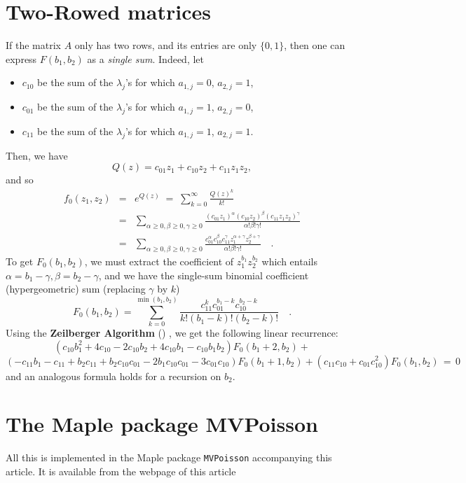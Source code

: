 \documentclass[11pt]{article}
\newcommand{\beqn}{\begin{eqnarray*}}
\newcommand{\eeqn}{\end{eqnarray*}}
\begin{document}
\section{Two-Rowed matrices}
\label{sec:tworow}

If the matrix $A$ only has two rows, and its entries are only $\{0,1\}$, then
one can express $F(b_1,b_2)$ as a \emph{single sum}. Indeed, let


\begin{itemize}
\item
$c_{10}$ be the sum of the $\lambda _j$'s for which $a_{1,j}=0$, $a_{2,j}=1$,
\item
$c_{01}$ be the sum of the $\lambda _j$'s  for which $a_{1,j}=1$, $a_{2,j}=0$,
\item
$c_{11}$ be the sum of the $\lambda _j$'s for which $a_{1,j}=1$, $a_{2,j}=1$.
\end{itemize}
Then, we have
\[
Q(z)=c_{01} z_1+c_{10}z_2+c_{11}z_1z_2 ,
\]
and so
\beqn
f_0(z_1,z_2) &=& e^{Q(z)} \;=\; \sum_{k=0}^{\infty} \frac{Q(z)^k}{k!}
\\
&=&
\sum_{\alpha \geq 0, \beta \geq 0, \gamma \geq 0} 
 \frac{ (c_{01} z_1)^{\alpha } (c_{10} z_2)^{\beta } (c_{11} z_1 z_2)^{\gamma }}%
      {\alpha ! \beta ! \gamma !}
\\
&=&\sum_{\alpha \geq 0, \beta \geq 0, \gamma \geq 0} 
 \frac{ c_{01}^{\alpha } c_{10}^{\beta } c_{11}^{\gamma } z_1^{\alpha +\gamma } z_2^{\beta +\gamma } }%
  {\alpha ! \beta ! \gamma !} \quad .
\eeqn
To get $F_0(b_1,b_2)$, we must extract the coefficient of $z_1^{b_1} z_2^{b_2}$
 which entails
$\alpha =b_1-\gamma ,\beta =b_2-\gamma $, and we have the single-sum binomial coefficient (hypergeometric) sum
(replacing $\gamma $ by $k$)
\[
F_0(b_1,b_2)=\sum_{k=0}^{\min(b_1,b_2)}  \frac{c_{11}^k c_{01}^{b_1-k} c_{10}^{b_2-k}}{k! (b_1-k)! (b_2 -k)!} \quad .
\]
Using the {\bf Zeilberger Algorithm} (\cite{Z,PWZ}) , we get the following linear recurrence:
\[
(c_{10}b_1^2+4c_{10}-2c_{10}b_2+4c_{10}b_1-c_{10}b_1b_2)F_0(b_1+2,b_2)
+
\]
\[
(-c_{11}b_1-c_{11}+b_2c_{11}+b_2c_{10}c_{01}-2b_1c_{10}c_{01}-3c_{01}c_{10})F_0(b_1+1,b_2)+
(c_{11}c_{10}+c_{01}c_{10}^2)F_0(b_1,b_2) \, = \, 0 %
\]
and an analogous formula holds for a recursion on $b_2$.

\section{The Maple package MVPoisson}
\label{sec:package}

All this is implemented in the Maple package
{\tt MVPoisson} accompanying this article. It is
available from the webpage of this article
\end{document}
